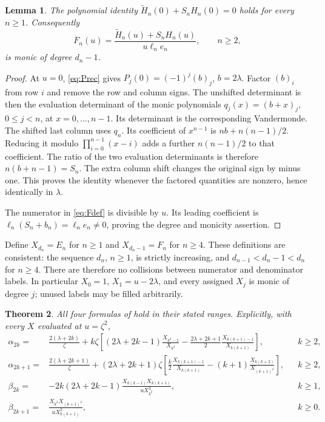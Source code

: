 \documentclass[11pt]{article}
\numberwithin{equation}{section}
\newtheorem{theorem}{Theorem}[section]
\newtheorem{lemma}[theorem]{Lemma}
\theoremstyle{remark}
\newcommand{\wt}{\widetilde}
\begin{document}
\begin{lemma}\label{lem:constantshift}
The polynomial identity $\wt H_n(0)+S_nH_n(0)=0$ holds for every
$n\ge1$. Consequently
\begin{equation}\label{eq:Fdef}
 F_n(u)=\frac{\wt H_n(u)+S_nH_n(u)}{u\ell_ne_n},\qquad n\ge2,
\end{equation}
is monic of degree $d_n-1$.
\end{lemma}

\begin{proof}
At $u=0$, \eqref{eq:Prec} gives $P_j(0)=(-1)^j(b)_j$, $b=2\lambda$.
Factor $(b)_i$ from row $i$ and remove the row and column signs.
The unshifted determinant is then the evaluation determinant of the
monic polynomials $q_j(x)=(b+x)_j$, $0\le j<n$, at $x=0,\ldots,n-1$.
Its determinant is the corresponding Vandermonde. The shifted last
column uses $q_n$. Its coefficient of $x^{n-1}$ is
$nb+n(n-1)/2$. Reducing it modulo $\prod_{i=0}^{n-1}(x-i)$ adds a
further $n(n-1)/2$ to that coefficient. The ratio of the two evaluation
determinants is therefore $n(b+n-1)=S_n$. The extra column shift changes
the original sign by minus one. This proves the identity whenever
the factored quantities are nonzero, hence identically in $\lambda$.

The numerator in \eqref{eq:Fdef} is divisible by $u$. Its leading
coefficient is $\ell_n(S_n+b_n)=\ell_ne_n\ne0$, proving the degree
and monicity assertion.
\end{proof}

Define $X_{d_n}=E_n$ for $n\ge1$ and $X_{d_n-1}=F_n$ for $n\ge4$.
These definitions are consistent: the sequence $d_n$, $n\ge1$, is
strictly increasing, and $d_{n-1}<d_n-1<d_n$ for $n\ge4$. There are
therefore no collisions between numerator and denominator labels.
In particular $X_0=1$, $X_1=u-2\lambda$, and every assigned $X_j$
is monic of degree $j$; unused labels may be filled arbitrarily.

\begin{theorem}\label{thm:LZ25}
All four formulas of \cite[Conjecture~2.5]{LyuZhou2026} hold in their
stated ranges. Explicitly, with every $X$ evaluated at $u=\zeta^2$,
\begin{align}
 \alpha_{2k}={}&\frac{2(\lambda+2k)}\zeta
 +k\zeta\left[(2\lambda+2k-1)\frac{X_{k^2-1}}{X_{k^2}}
 -\frac{2\lambda+2k+1}{2}
       \frac{X_{k(k+1)-1}}{X_{k(k+1)}}\right],&&k\ge2,
 \label{eq:LZaeven}\\
 \alpha_{2k+1}={}&\frac{2(\lambda+2k+1)}\zeta
 +(2\lambda+2k+1)\zeta\left[
 \frac k2\frac{X_{k(k+1)-1}}{X_{k(k+1)}}
 -(k+1)\frac{X_{k(k+2)}}{X_{(k+1)^2}}\right],&&k\ge2,
 \label{eq:LZaodd}\\
 \beta_{2k}={}&-2k(2\lambda+2k-1)
       \frac{X_{k(k-1)}X_{k(k+1)}}{uX_{k^2}^2},&&k\ge1,
 \label{eq:betaeven}\\
 \beta_{2k+1}={}&\frac{X_{k^2}X_{(k+1)^2}}{uX_{k(k+1)}^2},&&k\ge0.
 \label{eq:betaodd}
\end{align}
\end{theorem}
\end{document}
